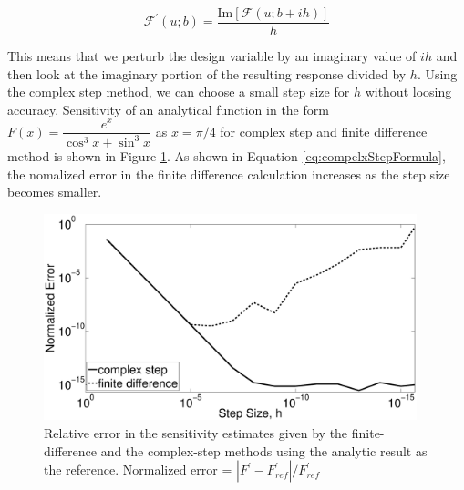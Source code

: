 \documentclass{aiaa-pretty}
\begin{document}
%
\begin{equation}\label{eq:compelxStepFormula}
	\mathcal{F}^\prime\left(u; b\right) = \frac{\text{Im}\left[ \mathcal{F}\left(u; b + ih\right) \right]}{h}
\end{equation}
%

This means that we perturb the design variable by an imaginary value of $ih$ and then look at the imaginary portion of the resulting response divided by $h$. Using the complex step method, we can choose a small step size for $h$ without loosing accuracy. Sensitivity of an analytical function in the form $F(x) = \dfrac{e^x}{\cos^3 x + \sin^3 x}$ as $x = \pi/4$ for complex step and finite difference method is shown in Figure \ref{fig:CSvsFD}. As shown in Equation \eqref{eq:compelxStepFormula}, the nomalized error in the finite difference calculation increases as the step size becomes smaller.

%
\begin{figure}[H]
	\centering
	\includegraphics[height=6.0cm]{figure/FDvsCS.eps}
	\caption{Relative error in the sensitivity estimates given by the finite-difference and the complex-step methods using the analytic result as the reference. Normalized error = $\left| F^\prime - F^\prime_{ref} \right| / F^\prime_{ref}$}
	\label{fig:CSvsFD}
\end{figure}
%

\end{document}
